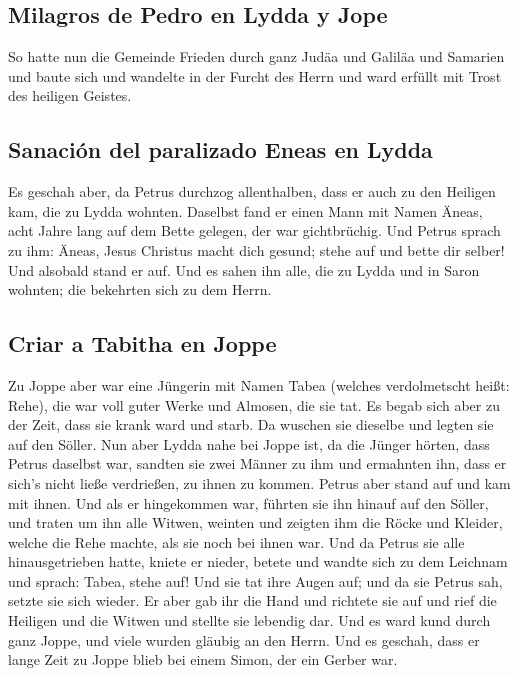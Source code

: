 \hypertarget{milagros-de-pedro-en-lydda-y-jope}{%
\subsection{Milagros de Pedro en Lydda y
Jope}\label{milagros-de-pedro-en-lydda-y-jope}}

 So hatte nun die Gemeinde Frieden durch ganz Judäa und
Galiläa und Samarien und baute sich und wandelte in der Furcht des Herrn
und ward erfüllt mit Trost des heiligen Geistes.

\hypertarget{sanaciuxf3n-del-paralizado-eneas-en-lydda}{%
\subsection{Sanación del paralizado Eneas en
Lydda}\label{sanaciuxf3n-del-paralizado-eneas-en-lydda}}

 Es geschah aber, da Petrus durchzog allenthalben, dass
er auch zu den Heiligen kam, die zu Lydda wohnten. 
Daselbst fand er einen Mann mit Namen Äneas, acht Jahre lang auf dem
Bette gelegen, der war gichtbrüchig.  Und Petrus sprach
zu ihm: Äneas, Jesus Christus macht dich gesund; stehe auf und bette dir
selber! Und alsobald stand er auf.  Und es sahen ihn
alle, die zu Lydda und in Saron wohnten; die bekehrten sich zu dem
Herrn.

\hypertarget{criar-a-tabitha-en-joppe}{%
\subsection{Criar a Tabitha en Joppe}\label{criar-a-tabitha-en-joppe}}

 Zu Joppe aber war eine Jüngerin mit Namen Tabea (welches
verdolmetscht heißt: Rehe), die war voll guter Werke und Almosen, die
sie tat.  Es begab sich aber zu der Zeit, dass sie krank
ward und starb. Da wuschen sie dieselbe und legten sie auf den Söller.
 Nun aber Lydda nahe bei Joppe ist, da die Jünger hörten,
dass Petrus daselbst war, sandten sie zwei Männer zu ihm und ermahnten
ihn, dass er sich's nicht ließe verdrießen, zu ihnen zu kommen.
 Petrus aber stand auf und kam mit ihnen. Und als er
hingekommen war, führten sie ihn hinauf auf den Söller, und traten um
ihn alle Witwen, weinten und zeigten ihm die Röcke und Kleider, welche
die Rehe machte, als sie noch bei ihnen war.  Und da
Petrus sie alle hinausgetrieben hatte, kniete er nieder, betete und
wandte sich zu dem Leichnam und sprach: Tabea, stehe auf! Und sie tat
ihre Augen auf; und da sie Petrus sah, setzte sie sich wieder.
 Er aber gab ihr die Hand und richtete sie auf und rief
die Heiligen und die Witwen und stellte sie lebendig dar.
 Und es ward kund durch ganz Joppe, und viele wurden
gläubig an den Herrn.  Und es geschah, dass er lange Zeit
zu Joppe blieb bei einem Simon, der ein Gerber war.

